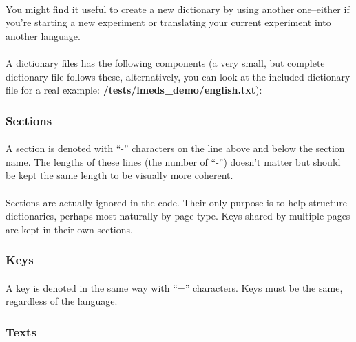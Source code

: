 \documentclass[12pt, oneside]{scrbook}   	%
\begin{document}
\paragraph{}
You might find it useful to create a new dictionary by using another one--either if you're starting a new experiment or translating your current experiment into another language.

\paragraph{}
A dictionary files has the following components (a very small, but complete dictionary file follows these, alternatively, you can look at the included dictionary file for a real example: \textbf{/tests/lmeds\_demo/english.txt}):

\subsubsection{Sections}

\paragraph{}
A section is denoted with ``-'' characters on the line above and below the section name.  The lengths of these lines (the number of ``-'') doesn't matter but should be kept the same length to be visually more coherent.  

\paragraph{}
Sections are actually ignored in the code.  Their only purpose is to help structure dictionaries, perhaps most naturally by page type.  Keys shared by multiple pages are kept in their own sections.

\subsubsection{Keys}

\paragraph{}
A key is denoted in the same way with ``='' characters.  Keys must be the same, regardless of the language. 

\subsubsection{Texts}
\end{document}
